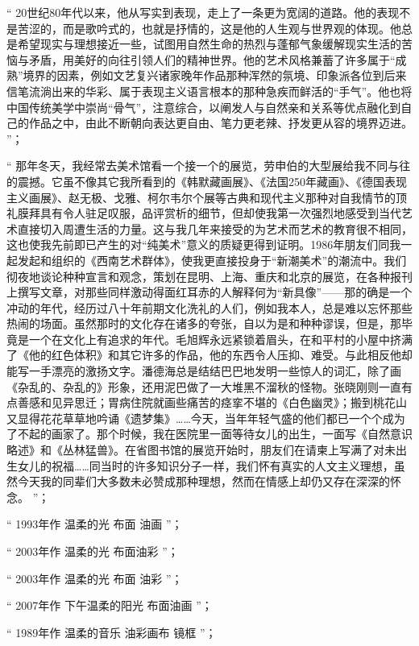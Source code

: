 \documentclass[master,oneside]{zjuthesis}
\begin{document}
“ 20世纪80年代以来，他从写实到表现，走上了一条更为宽阔的道路。他的表现不是苦涩的，而是歌吟式的，也就是抒情的，这是他的人生观与世界观的体现。他总是希望现实与理想接近一些，试图用自然生命的热烈与蓬郁气象缓解现实生活的苦恼与矛盾，用美好的向往引领人们的精神世界。他的艺术风格兼蓄了许多属于“成熟”境界的因素，例如文艺复兴诸家晚年作品那种浑然的氛境、印象派各位到后来信笔流淌出来的华彩、属于表现主义语言根本的那种急疾而鲜活的“手气”。他也将中国传统美学中崇尚“骨气”，注意综合，以阐发人与自然亲和关系等优点融化到自己的作品之中，由此不断朝向表达更自由、笔力更老辣、抒发更从容的境界迈进。 ”；

“ 那年冬天，我经常去美术馆看一个接一个的展览，劳申伯的大型展给我不同与往的震撼。它虽不像其它我所看到的《韩默藏画展》、《法国250年藏画》、《德国表现主义画展》、赵无极、戈雅、柯尔韦尔个展等古典和现代主义那种对自我情节的顶礼膜拜具有令人驻足叹服，品评赏析的细节，但却使我第一次强烈地感受到当代艺术直接切入周遭生活的力量。这与我几年来接受的为艺术而艺术的教育很不相同，这也使我先前即已产生的对“纯美术”意义的质疑更得到证明。1986年朋友们同我一起发起和组织的《西南艺术群体》，使我更直接投身于“新潮美术”的潮流中。我们彻夜地谈论种种宣言和观念，策划在昆明、上海、重庆和北京的展览，在各种报刊上撰写文章，对那些同样激动得面红耳赤的人解释何为“新具像”——那的确是一个冲动的年代，经历过八十年前期文化洗礼的人们，例如我本人，总是难以忘怀那些热闹的场面。虽然那时的文化存在诸多的夸张，自以为是和种种谬误，但是，那毕竟是一个在文化上有追求的年代。毛旭辉永远紧锁着眉头，在和平村的小屋中挤满了《他的红色体积》和其它许多的作品，他的东西令人压抑、难受。与此相反他却能写一手漂亮的激扬文字。潘德海总是结结巴巴地发明一些惊人的词汇，除了画《杂乱的、杂乱的》形象，还用泥巴做了一大堆黑不溜秋的怪物。张晓刚则一直有点善感和见异思迁；胃病住院就画些痛苦的痉挛不堪的《白色幽灵》；搬到桃花山又显得花花草草地吟诵《遗梦集》……今天，当年年轻气盛的他们都已一个个成为了不起的画家了。那个时候，我在医院里一面等待女儿的出生，一面写《自然意识略述》和《丛林猛兽》。在省图书馆的展览开始时，朋友们在请柬上写满了对未出生女儿的祝福……同当时的许多知识分子一样，我们怀有真实的人文主义理想，虽然今天我的同辈们大多数未必赞成那种理想，然而在情感上却仍又存在深深的怀念。 ”；

“ 1993年作 温柔的光 布面 油画 ”；

“ 2003年作 温柔的光 布面油彩 ”；

“ 2003年作 温柔的光 布面 油彩 ”；

“ 2007年作 下午温柔的阳光 布面油画 ”；

“ 1989年作 温柔的音乐 油彩画布 镜框 ”；
\end{document}

